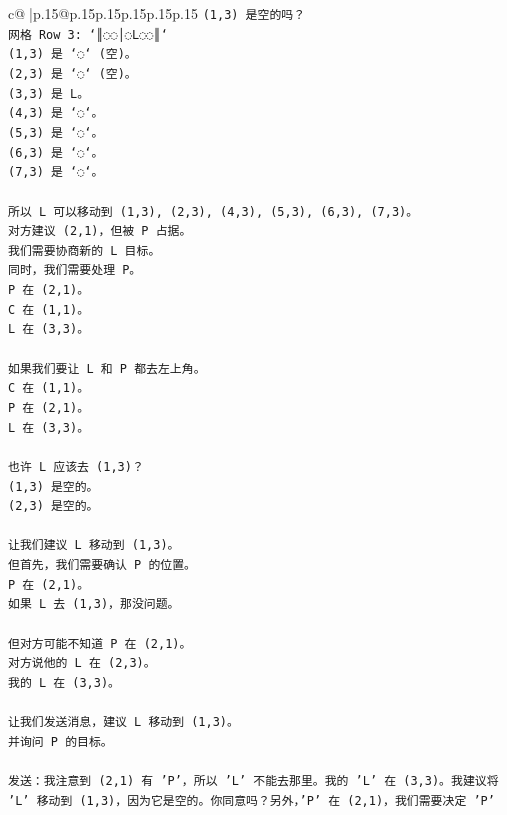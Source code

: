\documentclass{article}
\begin{document}
{\begin{supertabular}{c@{$\;$}|p{.15\linewidth}@{}p{.15\linewidth}p{.15\linewidth}p{.15\linewidth}p{.15\linewidth}p{.15\linewidth}}
{{{\texttt{(1,3) 是空的吗？} \\
\texttt{网格 Row 3: `║◌◌│◌L◌◌║`} \\
\texttt{(1,3) 是 `◌` (空)。} \\
\texttt{(2,3) 是 `◌` (空)。} \\
\texttt{(3,3) 是 L。} \\
\texttt{(4,3) 是 `◌`。} \\
\texttt{(5,3) 是 `◌`。} \\
\texttt{(6,3) 是 `◌`。} \\
\texttt{(7,3) 是 `◌`。} \\
\\ 
\texttt{所以 L 可以移动到 (1,3), (2,3), (4,3), (5,3), (6,3), (7,3)。} \\
\texttt{对方建议 (2,1)，但被 P 占据。} \\
\texttt{我们需要协商新的 L 目标。} \\
\texttt{同时，我们需要处理 P。} \\
\texttt{P 在 (2,1)。} \\
\texttt{C 在 (1,1)。} \\
\texttt{L 在 (3,3)。} \\
\\ 
\texttt{如果我们要让 L 和 P 都去左上角。} \\
\texttt{C 在 (1,1)。} \\
\texttt{P 在 (2,1)。} \\
\texttt{L 在 (3,3)。} \\
\\ 
\texttt{也许 L 应该去 (1,3)？} \\
\texttt{(1,3) 是空的。} \\
\texttt{(2,3) 是空的。} \\
\\ 
\texttt{让我们建议 L 移动到 (1,3)。} \\
\texttt{但首先，我们需要确认 P 的位置。} \\
\texttt{P 在 (2,1)。} \\
\texttt{如果 L 去 (1,3)，那没问题。} \\
\\ 
\texttt{但对方可能不知道 P 在 (2,1)。} \\
\texttt{对方说他的 L 在 (2,3)。} \\
\texttt{我的 L 在 (3,3)。} \\
\\ 
\texttt{让我们发送消息，建议 L 移动到 (1,3)。} \\
\texttt{并询问 P 的目标。} \\
\\ 
\texttt{发送：我注意到 (2,1) 有 'P'，所以 'L' 不能去那里。我的 'L' 在 (3,3)。我建议将 'L' 移动到 (1,3)，因为它是空的。你同意吗？另外，'P' 在 (2,1)，我们需要决定 'P'} \\
            }
        }
    }
     \\ \\


\end{supertabular}}
\end{document}
